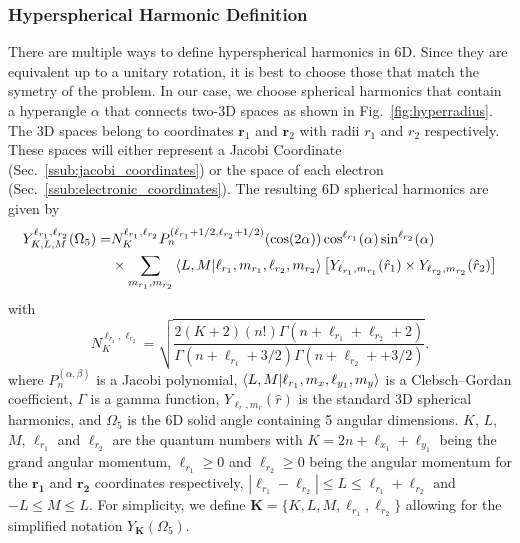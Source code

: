 \subsubsection{Hyperspherical Harmonic Definition} %
\label{ssub:spherical_harmonics}
There are multiple ways to define hyperspherical harmonics in 6D. Since they are equivalent up to a unitary rotation, it is best to choose those that match the symetry of the problem. In our case, we choose spherical harmonics that contain a hyperangle $\alpha$ that connects two-3D spaces as shown in Fig.~\ref{fig:hyperradius}. The 3D spaces belong to coordinates $\mathbf{r}_1$ and $\mathbf{r}_2$ with radii $r_1$ and $r_2$ respectively. These spaces will either represent a Jacobi Coordinate (Sec.~\ref{ssub:jacobi_coordinates}) or the space of each electron (Sec.~\ref{ssub:electronic_coordinates}). The resulting 6D spherical harmonics are given by
\begin{align}
    Y^{\ell_{r_1},\ell_{r_2}}_{K,L,M}(\Omega_{5}) =& N^{\ell_{r_1},\ell_{r_2}}_K P_n^{(\ell_{r_1}+1/2,\ell_{r_2}+1/2)}(\cos(2\alpha)) \cos^{\ell_{r_1}}(\alpha) \sin^{\ell_{r_2}}(\alpha) \\ 
    &\times\sum_{m_{r_1},m_{r_2}}\bra{L,M}\ket{\ell_{r_1},m_{r_1},\ell_{r_2},m_{r_2}}  \left[Y_{\ell_{r_1},m_{r_1}}(\hat{r}_1)\times Y_{\ell_{r_2},m_{r_2}}(\hat{r}_2)\right]
\end{align}
with
\begin{equation}
    N^{\ell_{r_1},\ell_{r_2}}_K = \sqrt{\frac{2(K+2)(n!)\Gamma (n+\ell_{r_1}+\ell_{r_2}+2)}{\Gamma (n+\ell_{r_1}+3/2) \Gamma (n+\ell_{r_2}++3/2)}}.
\end{equation}
where $P_n^{(\alpha,\beta)}$ is a Jacobi polynomial, $\bra{L,M}\ket{\ell_{r_1},m_x,\ell_{y_1},m_y}$ is a Clebsch–Gordan coefficient, $\Gamma$ is a gamma function, $Y_{\ell_{r},m_{r}}(\hat{r})$ is the standard 3D spherical harmonics, and $\Omega_5$ is the 6D solid angle containing 5 angular dimensions. $K$, $L$, $M$, $\ell_{r_1}$ and $\ell_{r_2}$ are the quantum numbers with $K=2n+\ell_{x_1}+\ell_{y_1}$ being the grand angular momentum, $\ell_{r_1}\ge0$ and $\ell_{r_2}\ge0$ being the angular momentum for the $\mathbf{r_1}$ and $\mathbf{r_2}$ coordinates respectively, $|\ell_{r_1}-\ell_{r_2}|\le L \le \ell_{r_1}+\ell_{r_2}$ and $-L \le M \le L$. For simplicity, we define $\mathbf{K}=\{K, L, M, \ell_{r_1}, \ell_{r_2}\}$ allowing for the simplified notation $Y_{\mathbf{K}}(\Omega_{5})$.

